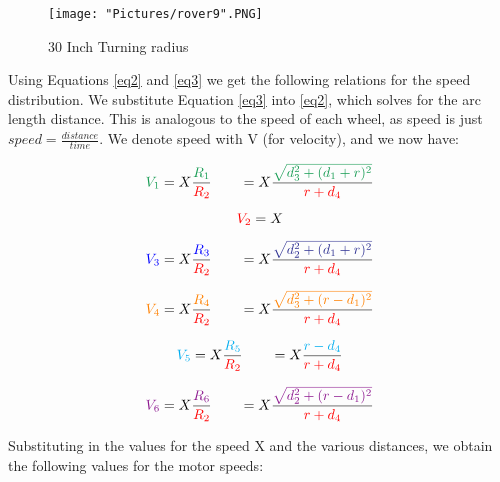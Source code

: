 \documentclass[12pt]{article}
\begin{document}
\begin{figure}[H]
 	\centering
	\texttt{[image: "Pictures/rover9".PNG]}
 	\caption{30 Inch Turning radius}
	\label{r6}
\end{figure}


\noindent Using Equations \ref{eq2} and  \ref{eq3} we get the following relations for the speed distribution. We substitute Equation \ref{eq3} into \ref{eq2}, which solves for the arc length distance. This is analogous to the speed of each wheel, as speed is just $speed = \frac{distance}{time}$.  We denote speed with V (for velocity), and we now have:

\begin{equation}
	\textcolor{ForestGreen}{V_1} = X \frac{\textcolor{ForestGreen}{R_1}}{\textcolor{red}{R_2}} \qquad = X \frac{\textcolor{ForestGreen}{\sqrt{d_3^2 + (d_1 + r)^2}}}{\textcolor{red}{r + d_4}}
\end{equation}

\begin{equation}
	\textcolor{red}{V_2} = X 
\end{equation}

\begin{equation}
	\textcolor{blue}{V_3} = X \frac{\textcolor{blue}{R_3}}{\textcolor{red}{R_2}} \qquad  = X \frac{\textcolor{Blue}{\sqrt{d_2^2 + (d_1 + r)^2}}}{\textcolor{red}{r + d_4}}
\end{equation}

\begin{equation}
	\textcolor{orange}{V_4} = X \frac{\textcolor{orange}{R_4}}{\textcolor{red}{R_2}} \qquad =  X \frac{\textcolor{orange}{\sqrt{d_3^2 + ( r - d_1)^2}}}{\textcolor{red}{r + d_4}}
\end{equation}

\begin{equation}
	\textcolor{cyan}{V_5} = X \frac{\textcolor{cyan}{R_5}}{\textcolor{red}{R_2}} \qquad =  X \frac{\textcolor{cyan}{r - d_4}}{\textcolor{red}{r + d_4}}
\end{equation}

\begin{equation}
	\textcolor{Plum}{V_6} = X \frac{\textcolor{Plum}{R_6}}{\textcolor{red}{R_2}} \qquad = X \frac{\textcolor{Plum}{\sqrt{d_2^2 + (r-d_1)^2}}}{\textcolor{red}{r + d_4}}
\end{equation}

\noindent Substituting in the values for the speed X and the various distances, we obtain the following values for the motor speeds:
\end{document}
